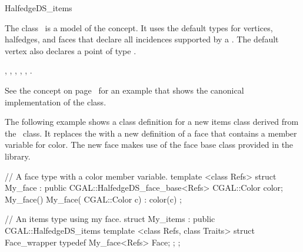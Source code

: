 
\ccRefPageBegin



\begin{ccRefClass}{HalfedgeDS_items}

\ccDefinition
  
The class \ccRefName\ is a model of the 
concept.  It uses the default types for vertices, halfedges, and
faces that declare all incidences supported by a .
The default vertex also declares a point of type .


\ccIsModel


\ccSeeAlso

,
,
,
,
,
.


\ccExample

See the  concept on
page~\pageref{pageHalfedgeDSitemsRef} for an example that shows the
canonical implementation of the  class.

The following example shows a class definition for a new items class
derived from the \ccRefName\ class. It replaces the 
with a new definition of a face that contains a member variable for
color. The new face makes use of the face base class provided in the
library.

\begin{ccExampleCode}
// A face type with a color member variable.
template <class Refs>
struct My_face : public CGAL::HalfedgeDS_face_base<Refs> {
    CGAL::Color color;
    My_face() {}
    My_face( CGAL::Color c) : color(c) {}
};

// An items type using my face.
struct My_items : public CGAL::HalfedgeDS_items {
    template <class Refs, class Traits>
    struct Face_wrapper {
        typedef My_face<Refs> Face;
    };
};
\end{ccExampleCode}

\end{ccRefClass}

\ccRefPageEnd

